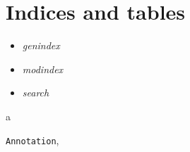 \documentclass[letterpaper,10pt,english]{sphinxmanual}
\begin{document}
\chapter{Indices and tables}
\label{index:indices-and-tables}\begin{itemize}
\item {} 
\emph{genindex}

\item {} 
\emph{modindex}

\item {} 
\emph{search}

\end{itemize}


\renewcommand{\indexname}{Python Module Index}
\begin{theindex}
\def\bigletter#1{{\Large\sffamily#1}\nopagebreak\vspace{1mm}}
\bigletter{a}
\item {\texttt{Annotation}}, \pageref{Other_api:module-Annotation}
\end{theindex}

\renewcommand{\indexname}{Index}
\printindex
\end{document}
